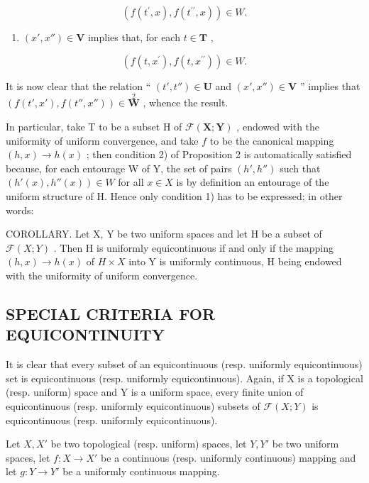 \[
\left(f \left(t ^ {\prime}, x\right), f \left(t ^ {\prime \prime}, x\right)\right) \in W.
\]

\begin{enumerate}
\def\labelenumi{\arabic{enumi})}
\setcounter{enumi}{1}
\tightlist
\item
  \((x', x'') \in \mathbf{V}\) implies that, for each \(t \in \mathbf{T}\) ,
\end{enumerate}

\[
(f (t, x ^ {\prime}), f (t, x ^ {\prime \prime})) \in W.
\]

It is now clear that the relation `` \((t', t'') \in \mathbf{U}\) and \((x', x'') \in \mathbf{V}\) '' implies that \((f(t', x'), f(t'', x'')) \in \overset{2}{\mathbf{W}}\) , whence the result.

In particular, take T to be a subset H of \(\mathcal{F}(\mathbf{X};\mathbf{Y})\) , endowed with the uniformity of uniform convergence, and take \(f\) to be the canonical mapping \((h,x)\to h(x)\) ; then condition 2) of Proposition 2 is automatically satisfied because, for each entourage W of Y, the set of pairs \((h',h'')\) such that \((h'(x),h''(x))\in W\) for all \(x\in X\) is by definition an entourage of the uniform structure of H. Hence only condition 1) has to be expressed; in other words:

COROLLARY. Let X, Y be two uniform spaces and let H be a subset of \(\mathcal{F}(X;Y)\) . Then H is uniformly equicontinuous if and only if the mapping \((h,x) \to h(x)\) of \(H \times X\) into Y is uniformly continuous, H being endowed with the uniformity of uniform convergence.

\subsection{SPECIAL CRITERIA FOR EQUICONTINUITY}

It is clear that every subset of an equicontinuous (resp. uniformly equicontinuous) set is equicontinuous (resp. uniformly equicontinuous). Again, if X is a topological (resp. uniform) space and Y is a uniform space, every finite union of equicontinuous (resp. uniformly equicontinuous) subsets of \(\mathcal{F}(X;Y)\) is equicontinuous (resp. uniformly equicontinuous).

Let \(X, X'\) be two topological (resp. uniform) spaces, let \(Y, Y'\) be two uniform spaces, let \(f: X \to X'\) be a continuous (resp. uniformly continuous) mapping and let \(g: Y \to Y'\) be a uniformly continuous mapping.

